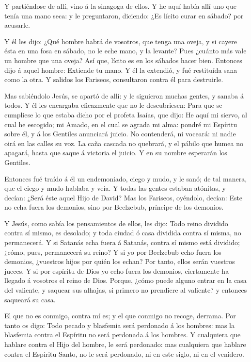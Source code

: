  Y partiéndose de allí, vino á la sinagoga de ellos.
 Y he aquí había allí uno que tenía una mano seca: y le
preguntaron, diciendo: ¿Es lícito curar en sábado? por acusarle.

 Y él les dijo: ¿Qué hombre habrá de vosotros, que tenga
una oveja, y si cayere ésta en una fosa en sábado, no le eche mano, y la
levante?  Pues ¿cuánto más vale un hombre que una oveja?
Así que, lícito es en los sábados hacer bien.  Entonces
dijo á aquel hombre: Extiende tu mano. Y él la extendió, y fué
restituída sana como la otra.  Y salidos los Fariseos,
consultaron contra él para destruirle.

 Mas sabiéndolo Jesús, se apartó de allí: y le siguieron
muchas gentes, y sanaba á todos.  Y él les encargaba
eficazmente que no le descubriesen:  Para que se cumpliese
lo que estaba dicho por el profeta Isaías, que dijo:  He
aquí mi siervo, al cual he escogido; mi Amado, en el cual se agrada mi
alma: pondré mi Espíritu sobre él, y á los Gentiles anunciará juicio.
 No contenderá, ni voceará: ni nadie oirá en las calles su
voz.  La caña cascada no quebrará, y el pábilo que humea no
apagará, hasta que saque á victoria el juicio.  Y en su
nombre esperarán los Gentiles.

 Entonces fué traído á él un endemoniado, ciego y mudo, y
le sanó; de tal manera, que el ciego y mudo hablaba y veía.
 Y todas las gentes estaban atónitas, y decían: ¿Será éste
aquel Hijo de David?  Mas los Fariseos, oyéndolo, decían:
Este no echa fuera los demonios, sino por Beelzebub, príncipe de los
demonios.

 Y Jesús, como sabía los pensamientos de ellos, les dijo:
Todo reino dividido contra sí mismo, es desolado; y toda ciudad ó casa
dividida contra sí misma, no permanecerá.  Y si Satanás
echa fuera á Satanás, contra sí mismo está dividido; ¿cómo, pues,
permanecerá su reino?  Y si yo por Beelzebub echo fuera los
demonios, ¿vuestros hijos por quién los echan? Por tanto, ellos serán
vuestros jueces.  Y si por espíritu de Dios yo echo fuera
los demonios, ciertamente ha llegado á vosotros el reino de Dios.
 Porque, ¿cómo puede alguno entrar en la casa del valiente,
y saquear sus alhajas, si primero no prendiere al valiente? y entonces
saqueará su casa.

 El que no es conmigo, contra mí es; y el que conmigo no
recoge, derrama.  Por tanto os digo: Todo pecado y
blasfemia será perdonado á los hombres: mas la blasfemia contra el
Espíritu no será perdonada á los hombres.  Y cualquiera que
hablare contra el Hijo del hombre, le será perdonado: mas cualquiera que
hablare contra el Espíritu Santo, no le será perdonado, ni en este
siglo, ni en el venidero.


